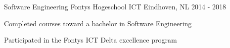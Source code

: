 

\begin{cventries}

  \cventry
    {Software Engineering} %
    {Fontys Hogeschool ICT} %
    {Eindhoven, NL} %
    {2014 - 2018} %
    {
      \begin{cvitems} %
        \item {Completed courses toward a bachelor in Software Engineering}
        \item {Participated in the Fontys ICT Delta excellence program}
      \end{cvitems}
    }

\end{cventries}
